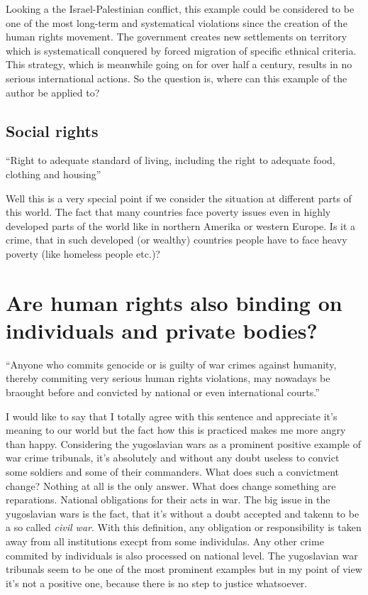 Looking a the Israel-Palestinian conflict, this example could be
considered to be one of the most long-term and systematical violations
since the creation of the human rights movement. The government
creates new settlements on territory which is systematicall conquered
by forced migration of specific ethnical criteria. This strategy, which
is meanwhile going on for over half a century, results in no serious
international actions. So the question is, where can this example of
the author be applied to?

\subsection{Social rights}
``Right to adequate standard of living, including the right to adequate
food, clothing and housing''
\cite[p. 22]{tfohr}

Well this is a very special point if we consider the situation at
different parts of this world. The fact that many countries face
poverty issues even in highly developed parts of the world like in
northern Amerika or western Europe. Is it a crime, that in such
developed (or wealthy) countries people have to face heavy poverty
(like homeless people etc.)?

\section{Are human rights also binding on individuals and private bodies?}
``Anyone who commits genocide or is guilty of war crimes against humanity,
thereby commiting very serious human rights violations, may nowadays be
braought before and convicted by national or even international courts.''
\cite[p. 27]{tfohr}

I would like to say that I totally agree with this sentence and
appreciate it's meaning to our world but the fact how this is practiced
makes me more angry than happy. Considering the yugoslavian wars as a
prominent positive example of war crime tribunals, it's absolutely and
without any doubt useless to convict some soldiers and some of their
commanders. What does such a convictment change? Nothing at all is the only
answer. What does change something are reparations. National obligations
for their acts in war. The big issue in the yugoslavian wars is the fact,
that it's without a doubt accepted and takenn to be a so called
\emph{civil war}. With this definition, any obligation or responsibility
is taken away from all institutions execpt from some individulas. Any
other crime commited by individuals is also processed on national level.
The yugoslavian war tribunals seem to be one of the most prominent examples
but in my point of view it's not a positive one, because there is no step
to justice whatsoever.


